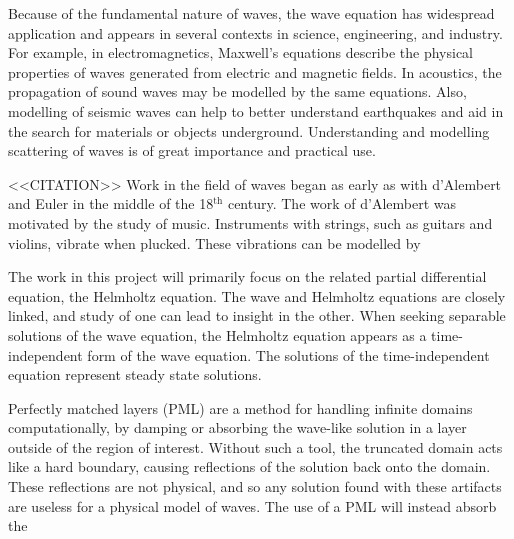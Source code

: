 
Because of the fundamental nature of waves, the wave equation has widespread application and appears in several contexts in science, engineering, and industry.
For example, in electromagnetics, Maxwell's equations describe the physical properties of waves generated from electric and magnetic fields.
In acoustics, the propagation of sound waves may be modelled by the same equations.
Also, modelling of seismic waves can help to better understand earthquakes and aid in the search for materials or objects underground.
Understanding and modelling scattering of waves is of great importance and practical use.

<<CITATION>>
Work in the field of waves began as early as with d'Alembert and Euler in the middle of the 18$^\text{th}$ century.
The work of d'Alembert was motivated by the study of music.
Instruments with strings, such as guitars and violins, vibrate when plucked.
These vibrations can be modelled by 



The work in this project will primarily focus on the related partial differential equation, the Helmholtz equation.
The wave and Helmholtz equations are closely linked, and study of one can lead to insight in the other.
When seeking separable solutions of the wave equation, the Helmholtz equation appears as a time-independent form of the wave equation.
The solutions of the time-independent equation represent steady state solutions.






Perfectly matched layers (PML) are a method for handling infinite domains computationally, by damping or absorbing the wave-like solution in a layer outside of the region of interest.
Without such a tool, the truncated domain acts like a hard boundary, causing reflections of the solution back onto the domain.
These reflections are not physical, and so any solution found with these artifacts are useless for a physical model of waves.
The use of a PML will instead absorb the 









